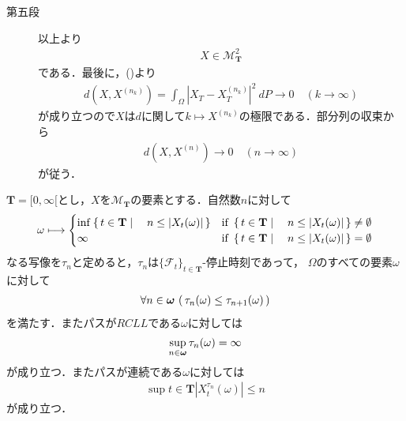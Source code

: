 \begin{sketch}
\begin{description}
 			\item[第五段]
 				以上より
 				\begin{align}
 					X \in \mathscr{M}^2_{\mathbf{T}}
 				\end{align}
 				である．最後に，()より
 				\begin{align}
 					d\left(X,X^{(n_k)}\right) = \int_\Omega \left|X_T-X_T^{(n_k)}\right|^2\ dP
 					\longrightarrow 0\quad (k \longrightarrow \infty)
 				\end{align}
 				が成り立つので$X$は$d$に関して$k \longmapsto X^{(n_k)}$の極限である．部分列の収束から
 				\begin{align}
 					d\left(X,X^{(n)}\right) \longrightarrow 0\quad (n \longrightarrow \infty)
 				\end{align}
 				が従う．
 				\QED
		\end{description}
	\end{sketch}
	
	\begin{screen}
		\begin{thm}[右連続マルチンゲールから停止時刻の増大列が作れる]
		\label{thm:increasing_stopping_times_made_from_continuous_martingales}
			$\mathbf{T} = [0,\infty[$とし，$X$を$\mathscr{M}_{\mathbf{T}}$の要素とする．自然数$n$に対して
			\begin{align}
				\omega \longmapsto 
				\begin{cases}
					\operatorname*{inf}_{} \left\{\, t \in \mathbf{T} \mid \quad n \leq |X_t(\omega)|\, \right\} & \mbox{if } \left\{\, t \in \mathbf{T} \mid \quad n \leq |X_t(\omega)|\, \right\} \neq \emptyset \\
					\infty & \mbox{if } \left\{\, t \in \mathbf{T} \mid \quad n \leq |X_t(\omega)|\, \right\} = \emptyset
				\end{cases}
			\end{align}
			なる写像を$\tau_n$と定めると，$\tau_n$は$\{\mathscr{F}_t\}_{t \in \mathbf{T}}$-停止時刻であって，
			$\Omega$のすべての要素$\omega$に対して
			\begin{align}
				\forall n \in {\boldsymbol \omega}\, \left(\, \tau_n(\omega) \leq \tau_{n+1}(\omega)\, \right)
			\end{align}
			を満たす．またパスが$RCLL$である$\omega$に対しては
			\begin{align}
				\operatorname*{sup}_{n \in {\boldsymbol \omega}} \tau_n(\omega) = \infty
			\end{align}
			が成り立つ．またパスが連続である$\omega$に対しては
			\begin{align}
				\sup{t \in \mathbf{T}}{\left|X^{\tau_n}_t(\omega)\right|} \leq n
			\end{align}
			が成り立つ．
		\end{thm}
	\end{screen}
	
